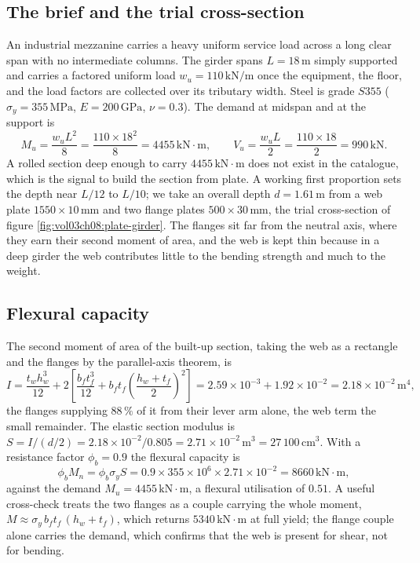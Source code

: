 \subsection{The brief and the trial cross-section}

An industrial mezzanine carries a heavy uniform service load across a
long clear span with no intermediate columns. The girder spans $L =
18\,\si{\meter}$ simply supported and carries a factored uniform load
$w_u = 110\,\text{kN}/\text{m}$ once the equipment, the floor, and the
load factors are collected over its tributary width. Steel is grade
$S355$ ($\sigma_y = 355\,\text{MPa}$, $E = 200\,\text{GPa}$,
$\nu = 0.3$). The demand at midspan and at the support is
\[
M_u = \frac{w_u L^2}{8} = \frac{110 \times 18^2}{8}
= 4455\,\text{kN}\cdot\text{m}, \qquad
V_u = \frac{w_u L}{2} = \frac{110 \times 18}{2} = 990\,\text{kN}.
\]
A rolled section deep enough to carry $4455\,\text{kN}\cdot\text{m}$
does not exist in the catalogue, which is the signal to build the
section from plate. A working first proportion sets the depth near
$L/12$ to $L/10$; we take an overall depth $d = 1.61\,\si{\meter}$ from
a web plate $1550 \times 10\,\si{\milli\meter}$ and two flange plates
$500 \times 30\,\si{\milli\meter}$, the trial cross-section of figure
\ref{fig:vol03ch08:plate-girder}. The flanges sit far from the neutral
axis, where they earn their second moment of area, and the web is kept
thin because in a deep girder the web contributes little to the bending
strength and much to the weight.



\subsection{Flexural capacity}

The second moment of area of the built-up section, taking the web as a
rectangle and the flanges by the parallel-axis theorem, is
\[
I = \frac{t_w h_w^3}{12} + 2\left[\frac{b_f t_f^3}{12}
+ b_f t_f\left(\frac{h_w + t_f}{2}\right)^2\right]
= 2.59 \times 10^{-3} + 1.92 \times 10^{-2}
= 2.18 \times 10^{-2}\,\si{\meter\tothe{4}},
\]
the flanges supplying $88\,\%$ of it from their lever arm alone, the
web term the small remainder. The elastic section modulus is $S = I/(d/2)
= 2.18\times 10^{-2}/0.805 = 2.71\times 10^{-2}\,\si{\meter\cubed} =
27\,100\,\text{cm}^3$. With a resistance factor $\phi_b = 0.9$ the
flexural capacity is
\[
\phi_b M_n = \phi_b \sigma_y S
= 0.9 \times 355 \times 10^6 \times 2.71 \times 10^{-2}
= 8660\,\text{kN}\cdot\text{m},
\]
against the demand $M_u = 4455\,\text{kN}\cdot\text{m}$, a flexural
utilisation of $0.51$. A useful cross-check treats the two flanges as a
couple carrying the whole moment, $M \approx \sigma_y\,b_f t_f\,(h_w +
t_f)$, which returns $5340\,\text{kN}\cdot\text{m}$ at full yield; the
flange couple alone carries the demand, which confirms that the web is
present for shear, not for bending.

